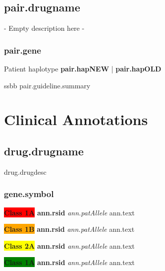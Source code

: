 \documentclass{book}
\begin{document}
{%
{%
{%
\subsection{ {{pair.drugname}} }
 - Empty description here -
{%
{%

\subsubsection{ {{pair.gene}} }

\begin{center}
Patient haplotype
\textbf{ {{pair.hapNEW}} } | \textbf{ {{pair.hapOLD}} } \newline\newline
\scriptsize
\begin{tabularx}{\textwidth}{ssbb}
{{pair.guideline.summary}}
\end{tabularx}

\end{center}
{%
{%
{%
\newpage
\normalsize


{%
\section{Clinical Annotations}

{%

\subsection{ {{drug.drugname}} }
{{drug.drugdesc}}

{%
{%
\subsubsection{ {{gene.symbol}} }

\begin{center}
{%
\textbf{\colorbox{red} {Class 1A}} \textbf{ {{ann.rsid}} } \textit{ {{ann.patAllele}} }
{{ann.text}}
{%
{%
\textbf{\colorbox{orange} {Class 1B}} \textbf{ {{ann.rsid}} } \textit{ {{ann.patAllele}} }
{{ann.text}}
{%
{%
\textbf{\colorbox{yellow} {Class 2A}} \textbf{ {{ann.rsid}} } \textit{ {{ann.patAllele}} }
{{ann.text}}
{%
{%
\textbf{\colorbox{green} {Class 1A}} \textbf{ {{ann.rsid}} } \textit{ {{ann.patAllele}} }
{{ann.text}}
{%

}}}}}}}}
\end{center}}}}}}}}}}}}}
\end{document}
